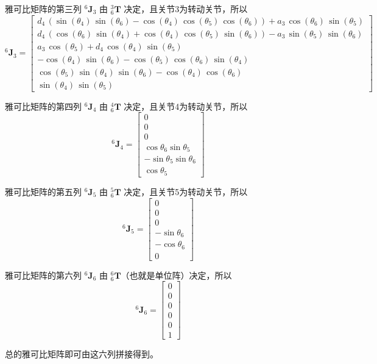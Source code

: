 \documentclass{homework}
\begin{document}
\begin{sol}
雅可比矩阵的第三列 $ {^6}\mathbf{J}_3 $ 由 $ _6^3\mathbf{T} $ 决定，且关节3为转动关节，所以
\[
  {^6}\mathbf{J}_3 =
  \begin{bmatrix} 
    d_{4}\,\left(\sin\left(\theta _{4}\right)\,\sin\left(\theta _{6}\right)-\cos\left(\theta _{4}\right)\,\cos\left(\theta _{5}\right)\,\cos\left(\theta _{6}\right)\right)+a_{3}\,\cos\left(\theta _{6}\right)\,\sin\left(\theta _{5}\right) \\ 
    d_{4}\,\left(\cos\left(\theta _{6}\right)\,\sin\left(\theta _{4}\right)+\cos\left(\theta _{4}\right)\,\cos\left(\theta _{5}\right)\,\sin\left(\theta _{6}\right)\right)-a_{3}\,\sin\left(\theta _{5}\right)\,\sin\left(\theta _{6}\right) \\ 
    a_{3}\,\cos\left(\theta _{5}\right)+d_{4}\,\cos\left(\theta _{4}\right)\,\sin\left(\theta _{5}\right) \\ 
    -\cos\left(\theta _{4}\right)\,\sin\left(\theta _{6}\right)-\cos\left(\theta _{5}\right)\,\cos\left(\theta _{6}\right)\,\sin\left(\theta _{4}\right) \\ 
    \cos\left(\theta _{5}\right)\,\sin\left(\theta _{4}\right)\,\sin\left(\theta _{6}\right)-\cos\left(\theta _{4}\right)\,\cos\left(\theta _{6}\right) \\ 
    \sin\left(\theta _{4}\right)\,\sin\left(\theta _{5}\right)
  \end{bmatrix}
\]

雅可比矩阵的第四列 $ {^6}\mathbf{J}_4 $ 由 $ _6^4\mathbf{T} $ 决定，且关节4为转动关节，所以
\[
  {^6}\mathbf{J}_4 =
  \begin{bmatrix}
    0 \\
    0 \\
    0 \\
    \cos\theta_6 \sin\theta_5 \\
    -\sin\theta_5 \sin\theta_6 \\
    \cos\theta_5
  \end{bmatrix}
\]

雅可比矩阵的第五列 $ {^6}\mathbf{J}_5 $ 由 $ _6^5\mathbf{T} $ 决定，且关节5为转动关节，所以
\[
  {^6}\mathbf{J}_5 =
  \begin{bmatrix}
    0 \\
    0 \\
    0 \\
    -\sin\theta_6 \\
    -\cos\theta_6 \\
    0
  \end{bmatrix}
\]

雅可比矩阵的第六列 $ {^6}\mathbf{J}_6 $ 由 $ _6^6\mathbf{T} $（也就是单位阵）决定，所以
\[
  {^6}\mathbf{J}_6 =
  \begin{bmatrix}
    0 \\
    0 \\
    0 \\
    0 \\
    0 \\
    1
  \end{bmatrix}
\]

总的雅可比矩阵即可由这六列拼接得到。

\end{sol}
\end{document}
